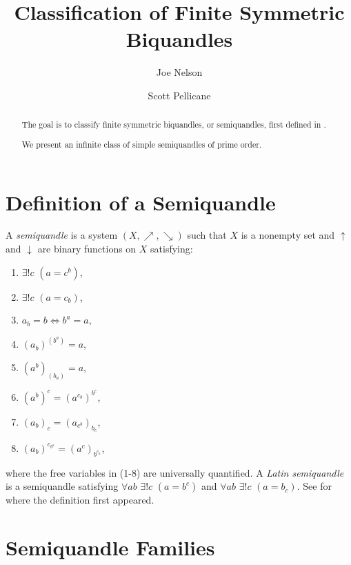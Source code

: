 \documentclass{amsart}
\theoremstyle{definition}
\numberwithin{equation}{section}
\begin{document}
\title{Classification of Finite Symmetric Biquandles}

\author{Joe Nelson}
\author{Scott Pellicane}

\begin{abstract}
The goal is to classify finite symmetric biquandles, or semiquandles, first defined in \cite{aH10}.

We present an infinite class of simple semiquandles of prime order.
\end{abstract}

\maketitle


\section{Definition of a Semiquandle}

A \emph{semiquandle} is a system $(X,\nearrow,\searrow)$ such that $X$ is a nonempty set and $\uparrow$ and $\downarrow$ are binary functions on $X$ satisfying:

\begin{enumerate}
\item $\exists!{c}$ $(a = c^b)$,
\item $\exists!{c}$ $(a = c_b)$,
\item $a_b = b \Leftrightarrow b^a = a$,
\item $(a_b)^{(b^a)} = a$,
\item $(a^b)_{(b_a)} = a$,
\item $(a^b)^c = (a^{c_b})^{b^c}$,
\item $(a_b)_c = (a_{c^b})_{b_c}$,
\item $(a_b)^{c_{b^a}} = (a^c)_{b^{c_a}}$,
\end{enumerate}
where the free variables in (1-8) are universally quantified. A \emph{Latin semiquandle} is a semiquandle satisfying $\forall{ab}$ $\exists!{c}$ $(a=b^c)$ and $\forall{ab}$ $\exists!{c}$ $(a=b_c)$. See \cite{aH10} for where the definition first appeared.


\section{Semiquandle Families}
\end{document}
